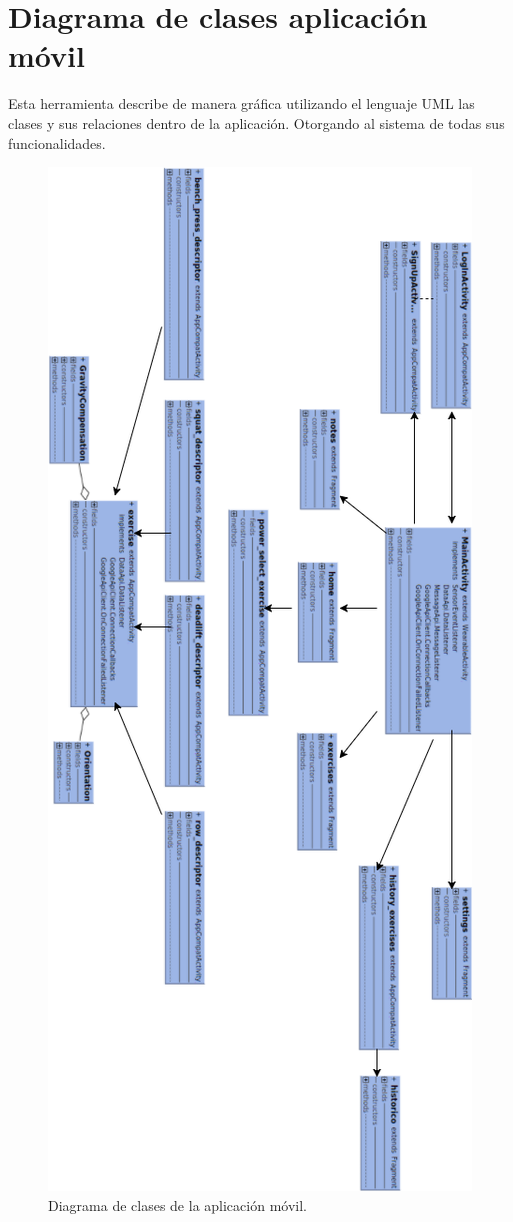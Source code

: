 \section{Diagrama de clases aplicación móvil}

Esta herramienta describe de manera gráfica utilizando el lenguaje UML las clases y sus relaciones dentro de la aplicación. Otorgando al sistema de todas sus funcionalidades.

\begin{figure}[H]
	\centering
	\includegraphics[scale=0.60]{imagenes/clases.jpg}
	\caption{Diagrama de clases de la aplicación móvil.}
	\label{Diagrama de clases android}
\end{figure}

